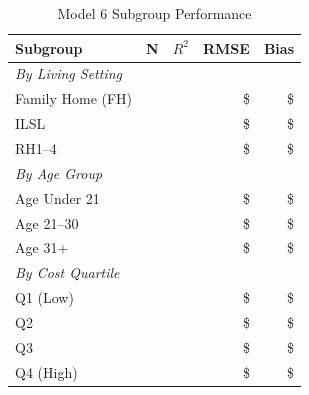 \begin{table}[h]
\centering
\caption{Model 6 Subgroup Performance}
\begin{tabular}{lrrrr}
\toprule
\textbf{Subgroup} & \textbf{N} & \textbf{$R^2$} & \textbf{RMSE} & \textbf{Bias} \\
\midrule
\multicolumn{5}{l}{\textit{By Living Setting}} \\
Family Home (FH) & \ModelSixSubgrouplivingFHN{} & \ModelSixSubgrouplivingFHRSquared{} & \$\ModelSixSubgrouplivingFHRMSE{} & \$\ModelSixSubgrouplivingFHBias{} \\
ILSL & \ModelSixSubgrouplivingILSLN{} & \ModelSixSubgrouplivingILSLRSquared{} & \$\ModelSixSubgrouplivingILSLRMSE{} & \$\ModelSixSubgrouplivingILSLBias{} \\
RH1--4 & \ModelSixSubgrouplivingRHOneToFourN{} & \ModelSixSubgrouplivingRHOneToFourRSquared{} & \$\ModelSixSubgrouplivingRHOneToFourRMSE{} & \$\ModelSixSubgrouplivingRHOneToFourBias{} \\
\midrule
\multicolumn{5}{l}{\textit{By Age Group}} \\
Age Under 21 & \ModelSixSubgroupageAgeUnderTwentyOneN{} & \ModelSixSubgroupageAgeUnderTwentyOneRSquared{} & \$\ModelSixSubgroupageAgeUnderTwentyOneRMSE{} & \$\ModelSixSubgroupageAgeUnderTwentyOneBias{} \\
Age 21--30 & \ModelSixSubgroupageAgeTwentyOneToThirtyN{} & \ModelSixSubgroupageAgeTwentyOneToThirtyRSquared{} & \$\ModelSixSubgroupageAgeTwentyOneToThirtyRMSE{} & \$\ModelSixSubgroupageAgeTwentyOneToThirtyBias{} \\
Age 31+ & \ModelSixSubgroupageAgeThirtyOnePlusN{} & \ModelSixSubgroupageAgeThirtyOnePlusRSquared{} & \$\ModelSixSubgroupageAgeThirtyOnePlusRMSE{} & \$\ModelSixSubgroupageAgeThirtyOnePlusBias{} \\
\midrule
\multicolumn{5}{l}{\textit{By Cost Quartile}} \\
Q1 (Low) & \ModelSixSubgroupcostQOneLowN{} & \ModelSixSubgroupcostQOneLowRSquared{} & \$\ModelSixSubgroupcostQOneLowRMSE{} & \$\ModelSixSubgroupcostQOneLowBias{} \\
Q2 & \ModelSixSubgroupcostQTwoN{} & \ModelSixSubgroupcostQTwoRSquared{} & \$\ModelSixSubgroupcostQTwoRMSE{} & \$\ModelSixSubgroupcostQTwoBias{} \\
Q3 & \ModelSixSubgroupcostQThreeN{} & \ModelSixSubgroupcostQThreeRSquared{} & \$\ModelSixSubgroupcostQThreeRMSE{} & \$\ModelSixSubgroupcostQThreeBias{} \\
Q4 (High) & \ModelSixSubgroupcostQFourHighN{} & \ModelSixSubgroupcostQFourHighRSquared{} & \$\ModelSixSubgroupcostQFourHighRMSE{} & \$\ModelSixSubgroupcostQFourHighBias{} \\
\bottomrule
\end{tabular}
\end{table}

